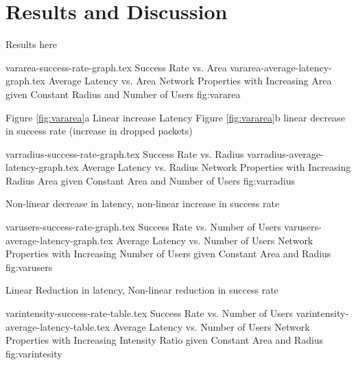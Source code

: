 \section{Results and Discussion}
Results here

\sidebysidefigures
{vararea-success-rate-graph.tex}       {Success Rate vs. Area}
{vararea-average-latency-graph.tex}    {Average Latency vs. Area}
{Network Properties with Increasing Area given Constant Radius and Number of Users}
{fig:vararea}

Figure \ref{fig:vararea}a Linear increase Latency
Figure \ref{fig:vararea}b linear decrease in success rate (increase in dropped packets)

\sidebysidefigures
{varradius-success-rate-graph.tex}     {Success Rate vs. Radius}
{varradius-average-latency-graph.tex}  {Average Latency vs. Radius}
{Network Properties with Increasing Radius Area given Constant Area and Number of Users}
{fig:varradius}

Non-linear decrease in latency, non-linear increase in success rate

\sidebysidefigures
{varusers-success-rate-graph.tex}      {Success Rate vs. Number of Users}
{varusers-average-latency-graph.tex}   {Average Latency vs. Number of Users}
{Network Properties with Increasing Number of Users given Constant Area and Radius}
{fig:varusers}

Linear Reduction in latency, Non-linear reduction in success rate

\sidebysidefigures
{varintensity-success-rate-table.tex}      {Success Rate vs. Number of Users}
{varintensity-average-latency-table.tex}   {Average Latency vs. Number of Users}
{Network Properties with Increasing Intensity Ratio given Constant Area and Radius}
{fig:varintesity}
